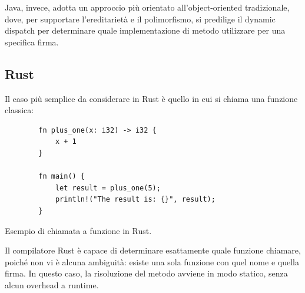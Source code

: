 Java, invece, adotta un approccio più orientato all'object-oriented tradizionale, dove, per supportare l'ereditarietà e il polimorfismo, si predilige il dynamic dispatch per determinare quale implementazione di metodo utilizzare per una specifica firma. 
\subsection{Rust}
Il caso più semplice da considerare in Rust è quello in cui si chiama una funzione classica:
\begin{listing}[H]
    \begin{verbatim}
        fn plus_one(x: i32) -> i32 {
            x + 1
        }

        fn main() {
            let result = plus_one(5);
            println!("The result is: {}", result);
        }
    \end{verbatim}
    \caption{Esempio di chiamata a funzione in Rust.}
    \label{lst:rust_function_call}
\end{listing}
Il compilatore Rust è capace di determinare esattamente quale funzione chiamare, poiché non vi è alcuna ambiguità: esiste una sola funzione con quel nome e quella firma. In questo caso, la risoluzione del metodo avviene in modo statico, senza alcun overhead a runtime.

